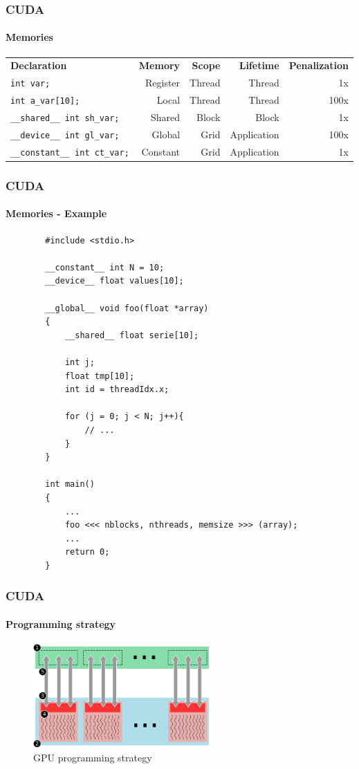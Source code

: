 \begin{frame}[fragile]
    \frametitle{CUDA}
    \framesubtitle{Memories}
    \begin{table}
    \centering
    \label{tab:memories-penalty}
    \scriptsize
    \begin{tabular}{l|r|r|r|r}
        \textbf{Declaration}  & \textbf{Memory}   & \textbf{Scope}  & \textbf{Lifetime}    & \textbf{Penalization} \\
        \texttt{int var;}                      & Register & Thread & Thread      & 1x \\
        \texttt{int a\_var[10];}            & Local    & Thread & Thread      & 100x \\
        \texttt{\_\_shared\_\_ int sh\_var;}    & Shared   & Block  & Block       & 1x \\
        \texttt{\_\_device\_\_ int gl\_var;}    & Global   & Grid   & Application & 100x \\
        \texttt{\_\_constant\_\_ int ct\_var;}& Constant & Grid   & Application & 1x 
    \end{tabular}
    \label{CUDA Memories}
    \end{table}
\end{frame}

\begin{frame}[fragile]
    \frametitle{CUDA}
    \framesubtitle{Memories - Example}

    \begin{lstlisting}
        #include <stdio.h>

        __constant__ int N = 10;
        __device__ float values[10];

        __global__ void foo(float *array)
        {
            __shared__ float serie[10];

            int j;
            float tmp[10];
            int id = threadIdx.x;

            for (j = 0; j < N; j++){
                // ...
            }
        }

        int main()
        {
            ...
            foo <<< nblocks, nthreads, memsize >>> (array);
            ...
            return 0;
        }
    \end{lstlisting}
\end{frame}

\begin{frame}
    \frametitle{CUDA}
    \framesubtitle{Programming strategy}
    \begin{figure}
        \centering
        \label{fig:cuda-strategy}
        \includegraphics[width=0.6\textwidth]{img/cuda-strategy}
        \caption{GPU programming strategy}
    \end{figure}
\end{frame}

